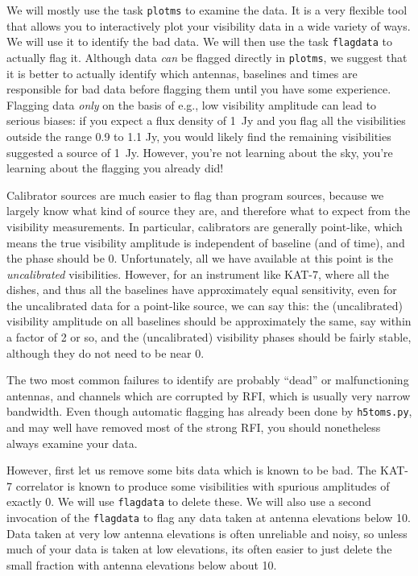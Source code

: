 \documentclass[force,almostfull,justified]{tufte-book}
\begin{document}
We will mostly use the task {\tt plotms} to examine the data.  It is a very flexible tool that allows
you to interactively plot your visibility data in a wide variety of ways.  We will use it to identify
the bad data. We will then use the task {\tt flagdata} to actually flag it.  Although data {\em can}
be flagged directly in {\tt plotms}, we suggest that it is better to actually identify which antennas,
baselines and times are responsible for bad data before flagging them until you have some experience.
Flagging data {\em only} on the basis of e.g., low visibility amplitude can lead to serious biases: if
you expect a flux density of 1~Jy and you flag all the visibilities outside the range 0.9 to 1.1 Jy,
you would likely find the remaining visibilities suggested a source of 1~Jy.  However, you're not
learning about the sky, you're learning about the flagging you already did!

Calibrator sources are much easier to flag than program sources, because we largely know what kind of
source they are, and therefore what to expect from the visibility measurements.  In particular,
calibrators are generally point-like, which means the true visibility amplitude is independent of
baseline (and of time), and the phase should be 0\arcdeg.  Unfortunately, all we have available at
this point is the {\em uncalibrated} visibilities.  However, for an instrument like KAT-7, where all
the dishes, and thus all the baselines have approximately equal sensitivity, even for the uncalibrated
data for a point-like source, we can say this: the (uncalibrated) visibility amplitude on all
baselines should be approximately the same, say within a factor of 2 or so, and the (uncalibrated)
visibility phases should be fairly stable, although they do not need to be near 0\arcdeg.

The two most common failures to identify are probably ``dead'' or malfunctioning antennas, and
channels which are corrupted by RFI, which is usually very narrow bandwidth.  Even though automatic
flagging has already been done by {\tt h5toms.py}, and may well have removed most of the strong RFI,
you should nonetheless always examine your data.

However, first let us remove some bits data which is known to be bad.  The KAT-7 correlator is known
to produce some visibilities with spurious amplitudes of exactly 0.  We will use {\tt flagdata} to
delete these.  We will also use a second invocation of the {\tt flagdata} to flag any data taken at
antenna elevations below 10\arcdeg.  Data taken at very low antenna elevations is often unreliable and
noisy, so unless much of your data is taken at low elevations, its often easier to just delete the
small fraction with antenna elevations below about 10\arcdeg.
\end{document}
